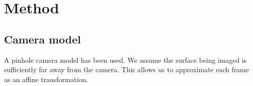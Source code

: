 \section{Method}
\subsection{Camera model}

A pinhole camera model has been used.
We assume the surface being imaged is sufficiently far away from the camera.
This allows us to approximate each frame as an affine transformation.
\begin{equation}

\end{equation}


